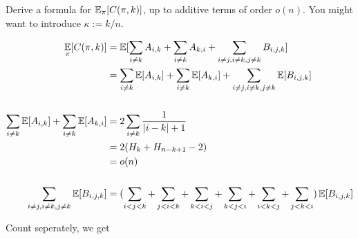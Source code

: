 \documentclass[11pt,a4paper,oneside]{article}
\newcommand{\E}{\mathop{\mathbb{E\/}}}
\begin{document}
\begin{problem}{9}
\statement
Derive a formula for $\E_{\pi} [C(\pi,k)]$, up to additive terms of order $o(n)$.
You might want to introduce $\kappa := k/n$.

\solution
    \[
        \begin{split}
            \E_{\pi} [C(\pi,k)] &= \E[\sum_{i \not= k}A_{i, k} + \sum_{i \not= k}A_{k, i} + \sum_{i \not= j, i \not= k,j \not= k}B_{i, j, k}]\\
            &= \sum_{i \not= k}\E[A_{i, k}] + \sum_{i \not= k}\E[A_{k, i}] + \sum_{i \not= j, i \not= k,j \not= k}\E[B_{i, j, k}]\\\\
            \sum_{i \not= k}\E[A_{i, k}] + \sum_{i \not= k}\E[A_{k, i}] &= 2\sum_{i \not= k}\frac{1}{|i - k| + 1} \\
			&= 2(H_k + H_{n - k + 1} - 2) \\
			&= o(n) \\\\
			\sum_{i \not= j, i \not= k,j \not= k}\E[B_{i, j, k}] &= (\sum_{i < j < k} + \sum_{j < i < k} + \sum_{k < i < j} + \sum_{k < j < i} + \sum_{i < k < j} + \sum_{j < k < i}) \E[B_{i, j, k}]
		\end{split}
	\]

	Count seperately, we get 


\end{problem}
\end{document}
